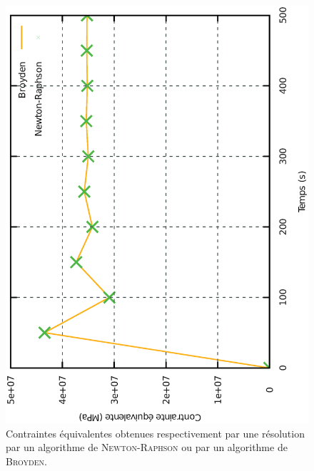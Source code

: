 \documentclass[12pt]{article}
\begin{document}
\begin{figure}[htbp]
  \centering
  \includegraphics[height=0.8\linewidth,angle=-90]{Images/CompSeq.eps}
  \caption{Contraintes équivalentes obtenues respectivement par une
    résolution par un algorithme de \textsc{Newton-Raphson} ou par un
    algorithme de \textsc{Broyden}.}
  \label{fig:CompVMis}
\end{figure}
\end{document}
